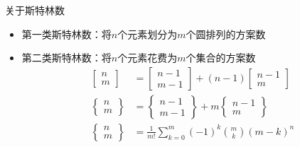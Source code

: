 \documentclass{beamer}
\begin{document}
\begin{frame}{关于斯特林数}
    \begin{itemize}
        \item 第一类斯特林数：将$n$个元素划分为$m$个圆排列的方案数 \pause
        \item 第二类斯特林数：将$n$个元素花费为$m$个集合的方案数 \pause
        $$\begin{aligned}
            \begin{bmatrix}n\\m\end{bmatrix} &= \begin{bmatrix}n - 1\\m - 1\end{bmatrix} + (n - 1)\begin{bmatrix}n - 1\\m\end{bmatrix}\\
            \begin{Bmatrix}n\\m\end{Bmatrix} &= \begin{Bmatrix}n - 1\\m - 1\end{Bmatrix} + m\begin{Bmatrix}n - 1\\m\end{Bmatrix}\\
            \begin{Bmatrix}n\\m\end{Bmatrix} &= \frac{1}{m!}\sum_{k = 0}^m(-1)^k {m\choose k}(m - k)^n
        \end{aligned}$$
    \end{itemize}
\end{frame}
\end{document}
